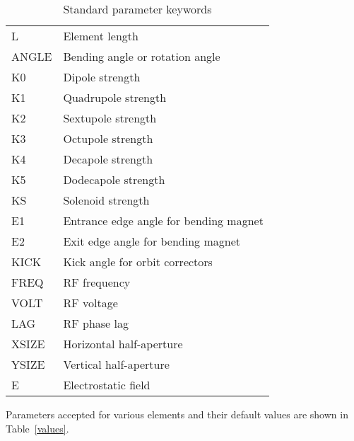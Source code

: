 \documentclass{article}
\begin{document}
\begin{table}[htb]
  \centering
  \caption{Standard parameter keywords}
  \label{keywords}
  \vspace{1em}
  \begin{tabular}{|lp{}|}
    \hline
    L     & Element length \\
    ANGLE & Bending angle or rotation angle \\
    K0    & Dipole strength \\
    K1    & Quadrupole strength \\
    K2    & Sextupole strength \\
    K3    & Octupole strength \\
    K4    & Decapole strength \\
    K5    & Dodecapole strength \\
    KS    & Solenoid strength \\
    E1    & Entrance edge angle for bending magnet \\
    E2    & Exit edge angle for bending magnet \\
    KICK  & Kick angle for orbit correctors \\
    FREQ  & RF frequency \\
    VOLT  & RF voltage \\
    LAG   & RF phase lag \\
    XSIZE & Horizontal half-aperture \\
    YSIZE & Vertical half-aperture  \\
    E     & Electrostatic field \\
    \hline
  \end{tabular}
\end{table}
Parameters accepted for various elements and their default values are
shown in Table~\ref{values}.
\end{document}
